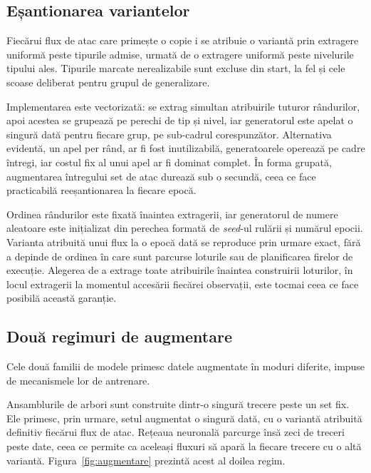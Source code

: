 \subsection{Eșantionarea variantelor}\label{subsec:esantionare}

Fiecărui flux de atac care primește o copie i se atribuie o variantă prin extragere uniformă peste tipurile admise, urmată de o extragere uniformă peste nivelurile tipului ales. Tipurile marcate nerealizabile sunt excluse din start, la fel și cele scoase deliberat pentru grupul de generalizare.

Implementarea este vectorizată: se extrag simultan atribuirile tuturor rândurilor, apoi acestea se grupează pe perechi de tip și nivel, iar generatorul este apelat o singură dată pentru fiecare grup, pe sub-cadrul corespunzător. Alternativa evidentă, un apel per rând, ar fi fost inutilizabilă, generatoarele operează pe cadre întregi, iar costul fix al unui apel ar fi dominat complet. În forma grupată, augmentarea întregului set de atac durează sub o secundă, ceea ce face practicabilă reeșantionarea la fiecare epocă.

Ordinea rândurilor este fixată înaintea extragerii, iar generatorul de numere aleatoare este inițializat din perechea formată de \textit{seed}-ul rulării și numărul epocii. Varianta atribuită unui flux la o epocă dată se reproduce prin urmare exact, fără a depinde de ordinea în care sunt parcurse loturile sau de planificarea firelor de execuție. Alegerea de a extrage toate atribuirile înaintea construirii loturilor, în locul extragerii la momentul accesării fiecărei observații, este tocmai ceea ce face posibilă această garanție.

\subsection{Două regimuri de augmentare}\label{subsec:regimuri}

Cele două familii de modele primesc datele augmentate în moduri diferite, impuse de mecanismele lor de antrenare.

Ansamblurile de arbori sunt construite dintr-o singură trecere peste un set fix. Ele primesc, prin urmare, setul augmentat o singură dată, cu o variantă atribuită definitiv fiecărui flux de atac. Rețeaua neuronală parcurge însă zeci de treceri peste date, ceea ce permite ca aceleași fluxuri să apară la fiecare trecere cu o altă variantă. Figura~\ref{fig:augmentare} prezintă acest al doilea regim.

